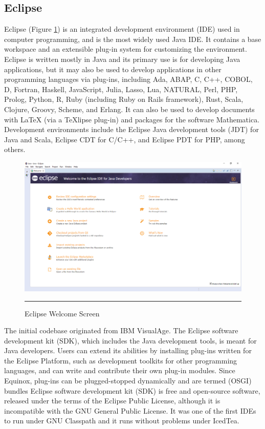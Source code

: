 \subsection{Eclipse}
Eclipse (Figure \ref{fig:eclipse}) is an integrated development environment (IDE) used in computer programming, and is the most widely used Java IDE. It contains a base workspace and an extensible plug-in system for customizing the environment. Eclipse is written mostly in Java and its primary use is for developing Java applications, but it may also be used to develop applications in other programming languages via plug-ins, including Ada, ABAP, C, C++, COBOL, D, Fortran, Haskell, JavaScript, Julia, Lasso, Lua, NATURAL, Perl, PHP, Prolog, Python, R, Ruby (including Ruby on Rails framework), Rust, Scala, Clojure, Groovy, Scheme, and Erlang. It can also be used to develop documents with LaTeX (via a TeXlipse plug-in) and packages for the software Mathematica. Development environments include the Eclipse Java development tools (JDT) for Java and Scala, Eclipse CDT for C/C++, and Eclipse PDT for PHP, among others.
\newline
\begin{figure}[h!]
	\centering
	\includegraphics[width=1\textwidth]{./images/eclipse}
	\rule{1\textwidth}{1pt}
	\caption{Eclipse Welcome Screen}
	\label{fig:eclipse}
\end{figure}
The initial codebase originated from IBM VisualAge. The Eclipse software development kit (SDK), which includes the Java development tools, is meant for Java developers. Users can extend its abilities by installing plug-ins written for the Eclipse Platform, such as development toolkits for other programming languages, and can write and contribute their own plug-in modules. Since Equinox, plug-ins can be plugged-stopped dynamically and are termed (OSGI) bundles Eclipse software development kit (SDK) is free and open-source software, released under the terms of the Eclipse Public License, although it is incompatible with the GNU General Public License. It was one of the first IDEs to run under GNU Classpath and it runs without problems under IcedTea.
